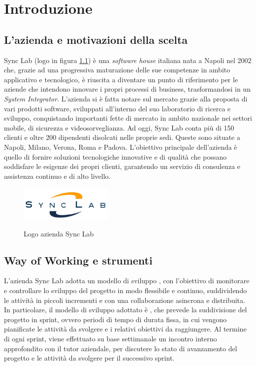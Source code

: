 \chapter{Introduzione}\label{cap:introduzione}

\section{L'azienda e motivazioni della scelta}

Sync Lab (logo in figura \ref{fig:logo-synclab}) è una \textit{software house} italiana nata a Napoli nel 2002 che, grazie ad una progressiva
maturazione delle sue competenze in ambito applicativo e tecnologico, è riuscita a diventare un
punto di riferimento per le aziende che intendono innovare i propri processi di business,
trasformandosi in un \textit{System Integrator}. L'azienda si è fatta notare sul mercato grazie alla proposta
di vari prodotti software, sviluppati all'interno del suo laboratorio di ricerca e sviluppo, 
conquistando importanti fette di mercato in ambito nazionale nei settori mobile, di sicurezza e videosorveglianza.
Ad oggi, Sync Lab conta più di 150 clienti e oltre 200 dipendenti disolcati nelle proprie sedi.
Queste sono situate a Napoli, Milano, Verona, Roma e Padova.
L'obiettivo principale dell'azienda è quello di fornire soluzioni tecnologiche innovative e di qualità
che possano soddisfare le esigenze dei propri clienti, garantendo un servizio di consulenza
e assistenza continuo e di alto livello.\\

\begin{figure}[h]
    \centering
    \includegraphics[width=0.4\textwidth, alt={Logo dell'azienda Sync Lab}]{immagini/synclab.png}
    \caption{Logo azienda Sync Lab}\label{fig:logo-synclab}
\end{figure}

\newpage

\section{Way of Working e strumenti}
L'azienda Sync Lab adotta un modello di sviluppo , con l'obiettivo di monitorare e controllare lo sviluppo del progetto in modo flessibile e continuo, suddividendo le attività
in piccoli incrementi e con una collaborazione asincrona e distribuita. In particolare, il modello di sviluppo adottato è , che prevede la suddivisione del progetto in sprint,
ovvero periodi di tempo di durata fissa, in cui vengono pianificate le attività da svolgere e i relativi obiettivi da raggiungere. Al termine di ogni sprint, viene effettuato su base settimanale
un incontro interno approfondito con il tutor aziendale, per discutere lo stato di avanzamento del progetto e le attività da svolgere per il successivo sprint. \\


